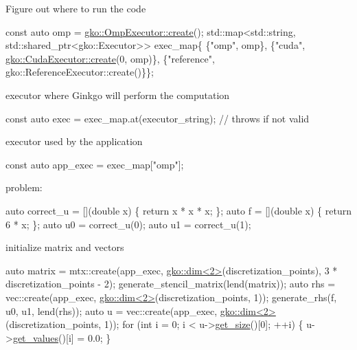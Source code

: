Figure out where to run the code


\begin{DoxyCode}
\textcolor{keyword}{const} \textcolor{keyword}{auto} omp = \hyperlink{classgko_1_1OmpExecutor_a33ca05fdd0fc928ee262fc9425304874}{gko::OmpExecutor::create}();
std::map<std::string, std::shared\_ptr<gko::Executor>> exec\_map\{
    \{\textcolor{stringliteral}{"omp"}, omp\},
    \{\textcolor{stringliteral}{"cuda"}, \hyperlink{classgko_1_1CudaExecutor_a2718a92034350650ef406ffdb60db090}{gko::CudaExecutor::create}(0, omp)\},
    \{\textcolor{stringliteral}{"reference"}, gko::ReferenceExecutor::create()\}\};
\end{DoxyCode}


executor where Ginkgo will perform the computation


\begin{DoxyCode}
\textcolor{keyword}{const} \textcolor{keyword}{auto} exec = exec\_map.at(executor\_string);  \textcolor{comment}{// throws if not valid}
\end{DoxyCode}


executor used by the application


\begin{DoxyCode}
\textcolor{keyword}{const} \textcolor{keyword}{auto} app\_exec = exec\_map[\textcolor{stringliteral}{"omp"}];
\end{DoxyCode}


problem\+:


\begin{DoxyCode}
\textcolor{keyword}{auto} correct\_u = [](\textcolor{keywordtype}{double} x) \{ \textcolor{keywordflow}{return} x * x * x; \};
\textcolor{keyword}{auto} f = [](\textcolor{keywordtype}{double} x) \{ \textcolor{keywordflow}{return} 6 * x; \};
\textcolor{keyword}{auto} u0 = correct\_u(0);
\textcolor{keyword}{auto} u1 = correct\_u(1);
\end{DoxyCode}


initialize matrix and vectors


\begin{DoxyCode}
\textcolor{keyword}{auto} matrix = mtx::create(app\_exec, \hyperlink{structgko_1_1dim}{gko::dim<2>}(discretization\_points),
                          3 * discretization\_points - 2);
generate\_stencil\_matrix(lend(matrix));
\textcolor{keyword}{auto} rhs = vec::create(app\_exec, \hyperlink{structgko_1_1dim}{gko::dim<2>}(discretization\_points, 1));
generate\_rhs(f, u0, u1, lend(rhs));
\textcolor{keyword}{auto} u = vec::create(app\_exec, \hyperlink{structgko_1_1dim}{gko::dim<2>}(discretization\_points, 1));
\textcolor{keywordflow}{for} (\textcolor{keywordtype}{int} i = 0; i < u->\hyperlink{classgko_1_1LinOp_a31b3c003388eb0b95393154f68c2b98d}{get\_size}()[0]; ++i) \{
    u->\hyperlink{classgko_1_1matrix_1_1Dense_a3bc458e02fab8e4c9f60f70bd4d5a4f9}{get\_values}()[i] = 0.0;
\}
\end{DoxyCode}


